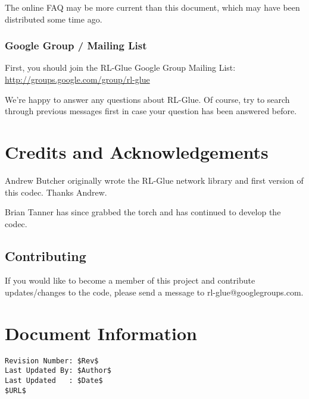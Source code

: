 \documentclass[11pt]{article}
\begin{document}
The online FAQ may be more current than this document, which may have been distributed some time ago.

\subsubsection{Google Group / Mailing List}
First, you should join the RL-Glue Google Group Mailing List:\newline
\url{http://groups.google.com/group/rl-glue}

We're happy to answer any questions about RL-Glue.  Of course, try to search through previous messages first in case your question has been answered before.


\section{Credits and Acknowledgements}
Andrew Butcher originally wrote the RL-Glue network library and first version of this codec.  Thanks Andrew.

Brian Tanner has since grabbed the torch and has continued to develop the codec.

\subsection{Contributing}
If you would like to become a member of this project and contribute updates/changes to the code, please send a message to rl-glue@googlegroups.com.


\section*{Document Information}
\begin{verbatim}
Revision Number: $Rev$
Last Updated By: $Author$
Last Updated   : $Date$
$URL$
\end{verbatim}
\end{document}
